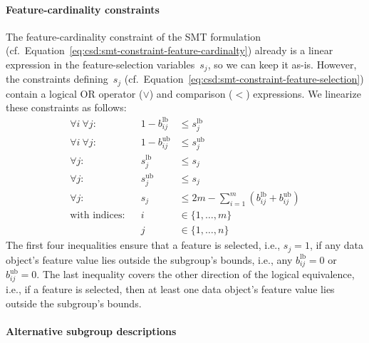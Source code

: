 \documentclass{article}
\theoremstyle{definition}
\begin{document}
\paragraph{Feature-cardinality constraints}

The feature-cardinality constraint of the SMT formulation (cf.~Equation~\ref{eq:csd:smt-constraint-feature-cardinalty}) already is a linear expression in the feature-selection variables~$s_j$, so we can keep it as-is.
However, the constraints defining~$s_j$ (cf.~Equation~\ref{eq:csd:smt-constraint-feature-selection}) contain a logical OR operator ($\lor$) and comparison ($<$) expressions.
We linearize these constraints as follows:
%
\begin{equation}
	\begin{aligned}
		\forall i~\forall j: & & 1 - b^{\text{lb}}_{ij} &\leq s^{\text{lb}}_j \\
		\forall i~\forall j: & & 1 - b^{\text{ub}}_{ij} &\leq s^{\text{ub}}_j \\
		\forall j: & & s^{\text{lb}}_j &\leq s_j \\
		\forall j: & & s^{\text{ub}}_j &\leq s_j \\
		\forall j: & & s_j &\leq 2m - \sum_{i=1}^{m} \left( b^{\text{lb}}_{ij} + b^{\text{ub}}_{ij} \right) \\
		\text{with indices:} & & i &\in \{1, \dots, m\} \\
		& & j &\in \{1, \dots, n\}
	\end{aligned}
	\label{eq:csd:milp-constraint-feature-selection}
\end{equation}
%
The first four inequalities ensure that a feature is selected, i.e., $s_j = 1$, if any data object's feature value lies outside the subgroup's bounds, i.e., any $b^{\text{lb}}_{ij} = 0$ or $b^{\text{ub}}_{ij} = 0$.
The last inequality covers the other direction of the logical equivalence, i.e., if a feature is selected, then at least one data object's feature value lies outside the subgroup's bounds.

\paragraph{Alternative subgroup descriptions}
\end{document}
